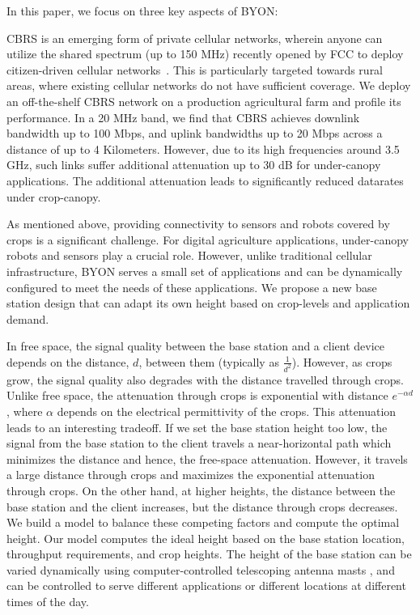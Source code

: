 In this paper, we focus on three key aspects of BYON:

 CBRS is an emerging form of private cellular networks, wherein anyone can utilize the shared spectrum (up to 150 MHz) recently opened by FCC to deploy citizen-driven cellular networks~\cite{cbrs}. This is particularly targeted towards rural areas, where existing cellular networks do not have sufficient coverage. We deploy an off-the-shelf CBRS network on a production agricultural farm and profile its performance. In a 20 MHz band, we find that CBRS achieves downlink bandwidth up to 100 Mbps, and uplink bandwidths up to 20 Mbps across a distance of up to 4 Kilometers. However, due to its high frequencies around 3.5 GHz, such links suffer additional attenuation up to 30 dB for under-canopy applications. The additional attenuation leads to significantly reduced datarates under crop-canopy. %

As mentioned above, providing connectivity to sensors and robots covered by crops is a significant challenge. For digital agriculture applications, under-canopy robots and sensors play a crucial role. However, unlike traditional cellular infrastructure, BYON serves a small set of applications and can be dynamically configured to meet the needs of these applications. We propose a new base station design that can adapt its own height  based on crop-levels and application demand. 

In free space, the signal quality between the base station and a client device depends on the distance, $d$, between them (typically as $\frac{1}{d^2}$). However, as crops grow, the signal quality also degrades with the distance travelled through crops. Unlike free space, the attenuation  through crops is exponential with distance $e^{-\alpha d}$, where $\alpha$ depends on the electrical permittivity of the crops. This attenuation leads to an interesting tradeoff. If we set the base station height too low, the signal from the base station to the client travels a near-horizontal path which minimizes the distance and hence, the free-space attenuation. However, it travels a large distance through crops and maximizes the exponential attenuation through crops. On the other hand, at higher heights, the distance between the base station and the client increases, but the distance through crops decreases. We build a model to balance these competing factors and compute the optimal height. Our model computes the ideal height based on the base station location, throughput requirements, and crop heights. The height of the base station can be varied dynamically using computer-controlled telescoping antenna masts \cite{aluma_smarttower, willburt_mast_stilleto}, and can be controlled to serve different applications or different locations at different times of the day.





